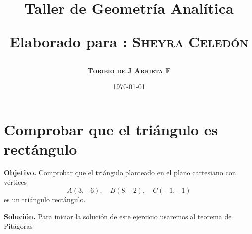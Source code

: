 \documentclass[12pt,a4paper]{article}
\title{\Large Taller de Geometría Analítica
	
\small{Elaborado para : \textsc{\bf{Sheyra Celedón}}}}
\author{\bf{\textsc{Toribio de J Arrieta F}}}
\date{\today}
\begin{document}
	\maketitle
	
\section{Comprobar que el triángulo es rectángulo}
	
	\textbf{Objetivo.} Comprobar que el triángulo planteado en el plano cartesiano con vértices
	\[
	A(3,-6),\quad B(8,-2),\quad C(-1,-1)
	\]
	es un triángulo rectángulo. 
	
	\vspace{5mm}

	\textbf{Solución.} Para iniciar la solución de este ejercicio usaremos al teorema de Pitágoras
	
	
	\bigskip
	
\end{document}
